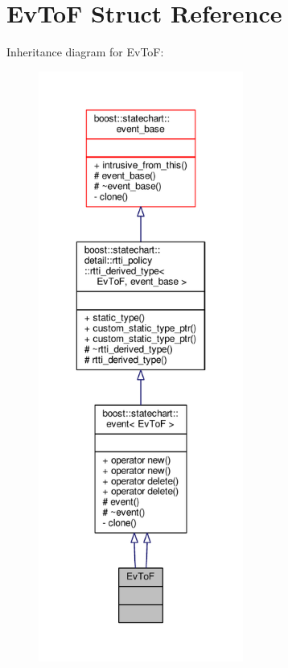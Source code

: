 \hypertarget{struct_ev_to_f}{}\section{Ev\+ToF Struct Reference}
\label{struct_ev_to_f}


Inheritance diagram for Ev\+ToF\+:
\nopagebreak
\begin{figure}[H]
\begin{center}
\leavevmode
\includegraphics[height=550pt]{struct_ev_to_f__inherit__graph}
\end{center}
\end{figure}


